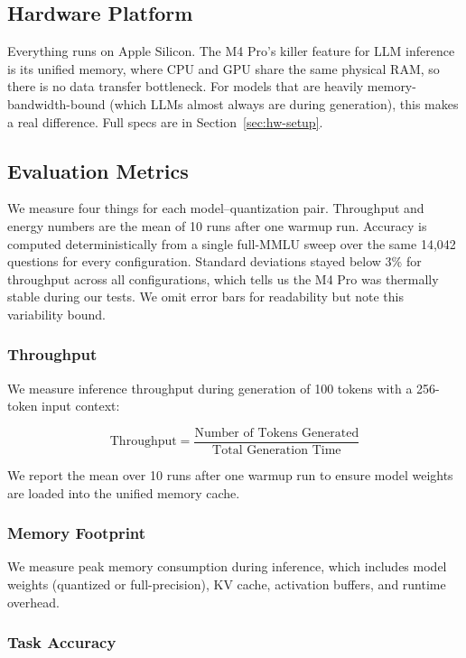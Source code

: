 \documentclass[11pt,a4paper]{article}
\begin{document}
\subsection{Hardware Platform}

Everything runs on Apple Silicon. The M4 Pro's killer feature for LLM inference is its unified memory, where CPU and GPU share the same physical RAM, so there is no data transfer bottleneck. For models that are heavily memory-bandwidth-bound (which LLMs almost always are during generation), this makes a real difference. Full specs are in Section~\ref{sec:hw-setup}.

\subsection{Evaluation Metrics}

We measure four things for each model--quantization pair. Throughput and energy numbers are the mean of 10 runs after one warmup run. Accuracy is computed deterministically from a single full-MMLU sweep over the same 14,042 questions for every configuration. Standard deviations stayed below 3\% for throughput across all configurations, which tells us the M4 Pro was thermally stable during our tests. We omit error bars for readability but note this variability bound.

\subsubsection{Throughput}

We measure inference throughput during generation of 100 tokens with a 256-token input context:

\begin{equation}
\text{Throughput} = \frac{\text{Number of Tokens Generated}}{\text{Total Generation Time}}
\end{equation}

We report the mean over 10 runs after one warmup run to ensure model weights are loaded into the unified memory cache.

\subsubsection{Memory Footprint}

We measure peak memory consumption during inference, which includes model weights (quantized or full-precision), KV cache, activation buffers, and runtime overhead.

\subsubsection{Task Accuracy}
\end{document}
